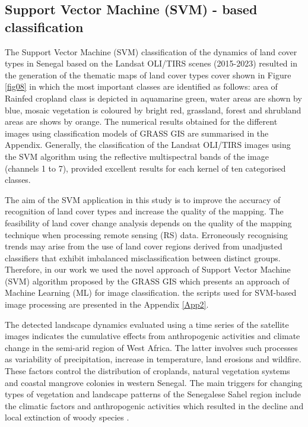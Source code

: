 \documentclass[earth,article,submit,pdftex,moreauthors]{Definitions/mdpi}
\begin{document}
\subsection{{Support Vector Machine (SVM) - based classification}}

{The Support Vector Machine (SVM) classification of the dynamics of land cover types in Senegal based on the Landsat OLI/TIRS scenes (2015-2023) resulted in the generation of the thematic maps of land cover types cover shown in Figure} \ref{fig08} {in which the most important classes are identified as follows: area of Rainfed cropland class is depicted in aquamarine green, water areas are shown by blue, mosaic vegetation is coloured by bright red, grassland, forest and shrubland areas are shows by orange. The numerical results obtained for the different images using classification models of GRASS GIS are summarised in the Appendix. Generally, the classification of the Landsat OLI/TIRS images using the SVM algorithm using the reflective multispectral bands of the image (channels 1 to 7), provided excellent results for each kernel of ten categorised classes.} 

{The aim of the SVM application in this study is to improve the accuracy of recognition of land cover types and increase the quality of the mapping. The feasibility of land cover change analysis depends on the quality of the mapping technique when processing remote sensing (RS) data. Erroneously recognising trends may arise from the use of land cover regions derived from unadjusted classifiers that exhibit imbalanced misclassification between distinct groups. Therefore, in our work we used the novel approach of Support Vector Machine (SVM) algorithm proposed by the GRASS GIS which presents an approach of Machine Learning (ML) for image classification. the scripts used for SVM-based image processing are presented in the Appendix} \ref{App2}.

{The} detected {landscape dynamics evaluated using a time series of the satellite images indicates the cumulative effects from anthropogenic activities and }climate change {in the} semi-arid region of West Africa. {The latter involves such processes as }variability of precipitation, increase in temperature, land erosions and wildfire. These factors control the distribution of croplands, natural vegetation systems and coastal mangrove colonies in western Senegal. {The} main triggers for changing types of vegetation and landscape patterns of the Senegalese Sahel region include the climatic factors and anthropogenic activities which resulted in the decline and local extinction of woody species \cite{land3030770}. 
\end{document}
